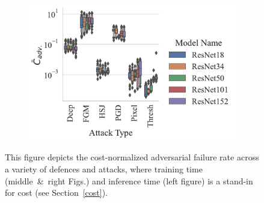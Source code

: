 \begin{figure}[h!]
\begin{subfigure}[]{0.3\textwidth}
        \centering
    \end{subfigure}
    \begin{subfigure}[]{0.35\textwidth}
        \includegraphics[width=\textwidth]{mnist/adv_failures_per_train_time_vs_attack_type.pdf}
        \centering
    \end{subfigure}
    \caption{This figure depicts the cost-normalized adversarial failure rate across a variety of defences and attacks, where training time (middle~\&~right Figs.) and inference time (left figure) is a stand-in for cost (see Section~\ref{cost}).}
    \label{fig:mnist_failures_per_train_time}
\end{figure}

